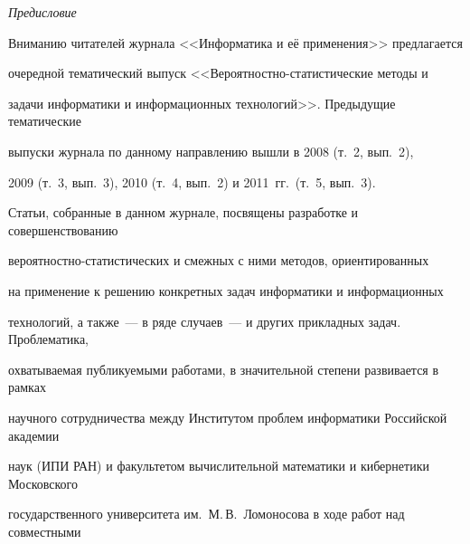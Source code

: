 

   { %

   { %

   

   \vspace*{-48pt}

   \begin{center}\LARGE

   \textit{Предисловие}

   \end{center}

   


   

   \vspace*{25mm}

   

   \thispagestyle{empty}

   

   { %

      Вниманию читателей журнала <<Информатика и её применения>> предлагается 

      очередной тематический выпуск <<Вероятностно-статистические методы и 

      задачи информатики и информационных технологий>>. Предыдущие тематические 

      выпуски журнала по данному направлению вышли в 2008 (т.~2, вып.~2), 

       2009 (т.~3, вып.~3),  2010 (т.~4, вып.~2)  и 2011~гг.\ (т.~5, вып.~3).

      

      Статьи, собранные в данном журнале, посвящены разработке и совершенствованию 

ве\-ро\-ят\-но\-ст\-но-ста\-ти\-сти\-че\-ских и смежных с ними методов, ориентированных 

на применение к решению конкретных задач информатики и информационных 

технологий, а также~--- в ряде случаев~--- и других прикладных задач. Проблематика, 

охватываемая публикуемыми работами, в значительной степени развивается в рамках 

научного сотрудничества между Институтом проблем информатики Российской академии 

наук (ИПИ РАН) и факультетом вычислительной математики и кибернетики Московского 

государственного университета им.\ М.\,В.~Ломоносова в ходе работ над совместными 

}}}
